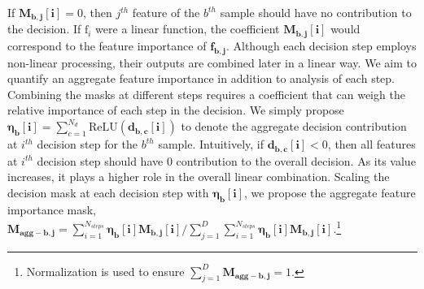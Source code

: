 If $\mathbf{M_{b,j}[i]} = 0$, then $j^{th}$ feature of the $b^{th}$ sample should have no contribution to the decision. 
If $\text{f}_i$ were a linear function, the coefficient $\mathbf{M_{b,j}[i]}$ would correspond to the feature importance of $\mathbf{f_{b,j}}$. 
Although each decision step employs non-linear processing, their outputs are combined later in a linear way. 
We aim to quantify an aggregate feature importance in addition to analysis of each step. 
Combining the masks at different steps requires a coefficient that can weigh the relative importance of each step in the decision. 
We simply propose $\mathbf{\eta_b[i]} =\sum_{c=1}^{N_d} \text{ReLU}(\mathbf{d_{b,c}[i]})$ to denote the aggregate decision contribution at $i^{th}$ decision step for the $b^{th}$ sample.
Intuitively, if $\mathbf{d_{b,c}[i]} < 0$, then all features at $i^{th}$ decision step should have 0 contribution to the overall decision.
As its value increases, it plays a higher role in the overall linear combination. Scaling the decision mask at each decision step with $\mathbf{\eta_b[i]}$, we propose the aggregate feature importance mask,
$\mathbf{M_{agg-b,j}} \! = \! \sum\nolimits_{i=1}^{N_{steps}}\! \mathbf{\eta_{b}[i]} \mathbf{M_{b,j}[i]} \Big/ \sum\nolimits_{j=1}^{D} \! \sum\nolimits_{i=1}^{N_{steps}} \! \mathbf{\eta_{b}[i]} \mathbf{M_{b,j}[i]}.$\footnote{Normalization is used to ensure $\sum\nolimits_{j=1}^{D} \mathbf{M_{agg-b,j}}=1$.}

